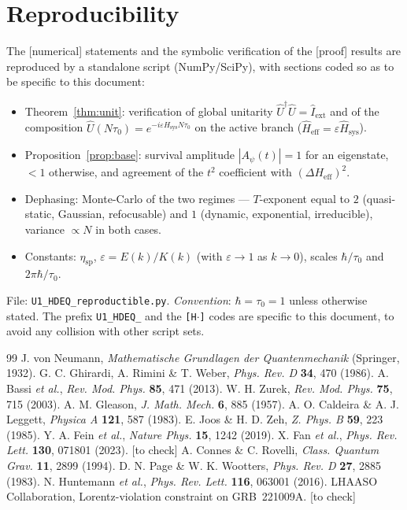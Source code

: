 \documentclass[11pt,a4paper]{article}
\newcommand{\Hsysop}{\hat{H}_{\mathrm{sys}}}
\newcommand{\Heff}{\hat{H}_{\mathrm{eff}}}
\newcommand{\Iext}{\hat{I}_{\mathrm{ext}}}
\newcommand{\statut}[1]{{\footnotesize\textsf{[#1]}}}
\theoremstyle{plain}
\theoremstyle{definition}
\theoremstyle{remark}
\begin{document}
\section*{Reproducibility}
The \statut{numerical} statements and the symbolic verification of the
\statut{proof} results are reproduced by a standalone script (NumPy/SciPy), with
sections coded so as to be specific to this document:
\begin{itemize}
\item[{\texttt{[H1]}}] Theorem~\ref{thm:unit}: verification of global unitarity $\hat U^\dagger\hat U=\Iext$ and of the composition $\hat U(N\tau_0)=e^{-i\varepsilon\Hsysop N\tau_0}$ on the active branch ($\Heff=\varepsilon\Hsysop$).
\item[{\texttt{[H2]}}] Proposition~\ref{prop:base}: survival amplitude $|A_\psi(t)|=1$ for an eigenstate, $<1$ otherwise, and agreement of the $t^2$ coefficient with $(\Delta H_{\mathrm{eff}})^2$.
\item[{\texttt{[H3]}}] Dephasing: Monte-Carlo of the two regimes --- $T$-exponent equal to $2$ (quasi-static, Gaussian, refocusable) and $1$ (dynamic, exponential, irreducible), variance $\propto N$ in both cases.
\item[{\texttt{[H4]}}] Constants: $\eta_{\mathrm{sp}}$, $\varepsilon=E(k)/K(k)$ (with $\varepsilon\to1$ as $k\to0$), scales $\hbar/\tau_0$ and $2\pi\hbar/\tau_0$.
\end{itemize}
File: \texttt{U1\_HDEQ\_reproductible.py}. \emph{Convention}: $\hbar=\tau_0=1$ unless
otherwise stated. The prefix \texttt{U1\_HDEQ\_} and the \texttt{[H$\cdot$]} codes are
specific to this document, to avoid any collision with other script sets.

\begin{thebibliography}{99}
 J. von Neumann, \textit{Mathematische Grundlagen der Quantenmechanik} (Springer, 1932).
 G. C. Ghirardi, A. Rimini \& T. Weber, \textit{Phys. Rev. D} \textbf{34}, 470 (1986).
 A. Bassi \textit{et al.}, \textit{Rev. Mod. Phys.} \textbf{85}, 471 (2013).
 W. H. Zurek, \textit{Rev. Mod. Phys.} \textbf{75}, 715 (2003).
 A. M. Gleason, \textit{J. Math. Mech.} \textbf{6}, 885 (1957).
 A. O. Caldeira \& A. J. Leggett, \textit{Physica A} \textbf{121}, 587 (1983).
 E. Joos \& H. D. Zeh, \textit{Z. Phys. B} \textbf{59}, 223 (1985).
 Y. A. Fein \textit{et al.}, \textit{Nature Phys.} \textbf{15}, 1242 (2019).
 X. Fan \textit{et al.}, \textit{Phys. Rev. Lett.} \textbf{130}, 071801 (2023). \statut{to check}
 A. Connes \& C. Rovelli, \textit{Class. Quantum Grav.} \textbf{11}, 2899 (1994).
 D. N. Page \& W. K. Wootters, \textit{Phys. Rev. D} \textbf{27}, 2885 (1983).
 N. Huntemann \textit{et al.}, \textit{Phys. Rev. Lett.} \textbf{116}, 063001 (2016).
 LHAASO Collaboration, Lorentz-violation constraint on GRB~221009A. \statut{to check}
\end{thebibliography}
\end{document}
